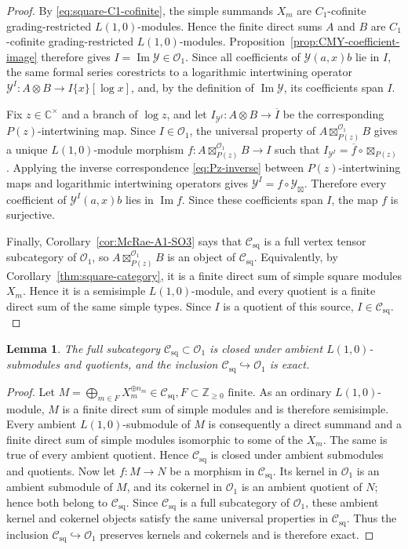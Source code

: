 \documentclass[10pt,a4paper]{amsart}
\numberwithin{equation}{section} \newtheorem{thm}{Theorem}[section] \newtheorem{lem}[thm]{Lemma} \newtheorem{ex}[thm]{Example} \newtheorem{prop}[thm]{Proposition} \newtheorem{cor}[thm]{Corollary} \newtheorem{defi}[thm]{Definition} \newtheorem{rmk}[thm]{Remark} \newtheorem{notation}[thm]{Notation}
\newcommand{\Csq}{\mathcal C_{\mathrm{sq}}}
\newcommand{\Ovir}{\mathcal O_1}
\def\Z{\mathbb{Z}} \def\N{\mathbb{N}} \def\A{\mathbb{A}} \def\C{\mathbb{C}} \def\R{\mathbb{R}} \def\Q{\mathbb{Q}} \def\F{\mathbb{F}}
\begin{document}
\begin{proof}
By \eqref{eq:square-C1-cofinite}, the simple summands $X_m$ are $C_1$-cofinite grading-restricted $L(1,0)$-modules. Hence the finite direct sums $A$ and $B$ are $C_1$-cofinite grading-restricted $L(1,0)$-modules. Proposition~\ref{prop:CMY-coefficient-image} therefore gives \(I=\operatorname{Im}\mathcal Y\in\Ovir.\) Since all coefficients of $\mathcal Y(a,x)b$ lie in $I$, the same formal series corestricts to a logarithmic intertwining operator \(\mathcal Y^I:A\otimes B\longrightarrow I\{x\}[\log x]\), and, by the definition of $\operatorname{Im}\mathcal Y$, its coefficients span $I$.

Fix $z\in\C^\times$ and a branch of $\log z$, and let \(I_{\mathcal Y^I}:A\otimes B\longrightarrow\overline I\) be the corresponding $P(z)$-intertwining map. Since $I\in\Ovir$, the universal property of $A\boxtimes^{\Ovir}_{P(z)}B$ gives a unique $L(1,0)$-module morphism \(f:A\boxtimes^{\Ovir}_{P(z)}B\longrightarrow I\) such that \(I_{\mathcal Y^I}=\overline f\circ\boxtimes_{P(z)}\). Applying the inverse correspondence \eqref{eq:Pz-inverse} between $P(z)$-intertwining maps and logarithmic intertwining operators gives \(\mathcal Y^I=f\circ\mathcal Y_{\boxtimes}\). Therefore every coefficient of $\mathcal Y^I(a,x)b$ lies in $\operatorname{Im}f$. Since these coefficients span $I$, the map $f$ is surjective.

Finally, Corollary~\ref{cor:McRae-A1-SO3} says that $\Csq$ is a full vertex tensor subcategory of $\Ovir$, so $A\boxtimes^{\Ovir}_{P(z)}B$ is an object of $\Csq$. Equivalently, by Corollary~\ref{thm:square-category}, it is a finite direct sum of simple square modules $X_m$. Hence it is a semisimple $L(1,0)$-module, and every quotient is a finite direct sum of the same simple types. Since $I$ is a quotient of this source, \(I\in\Csq.\)
\end{proof}

\begin{lem}\label{lem:square-ambient-Serre}
The full subcategory $\Csq\subset\Ovir$ is closed under ambient $L(1,0)$-submodules and quotients, and the inclusion $\Csq\hookrightarrow\Ovir$ is exact.
\end{lem}

\begin{proof}
Let \(M=\bigoplus_{m\in F}X_m^{\oplus n_m}\in\Csq,F\subset\Z_{\ge0}\text{ finite}.\) As an ordinary $L(1,0)$-module, $M$ is a finite direct sum of simple modules and is therefore semisimple. Every ambient $L(1,0)$-submodule of $M$ is consequently a direct summand and a finite direct sum of simple modules isomorphic to some of the $X_m$. The same is true of every ambient quotient. Hence $\Csq$ is closed under ambient submodules and quotients. Now let $f:M\to N$ be a morphism in $\Csq$. Its kernel in $\Ovir$ is an ambient submodule of $M$, and its cokernel in $\Ovir$ is an ambient quotient of $N$; hence both belong to $\Csq$. Since $\Csq$ is a full subcategory of $\Ovir$, these ambient kernel and cokernel objects satisfy the same universal properties in $\Csq$. Thus the inclusion $\Csq\hookrightarrow\Ovir$ preserves kernels and cokernels and is therefore exact.
\end{proof}
\end{document}
